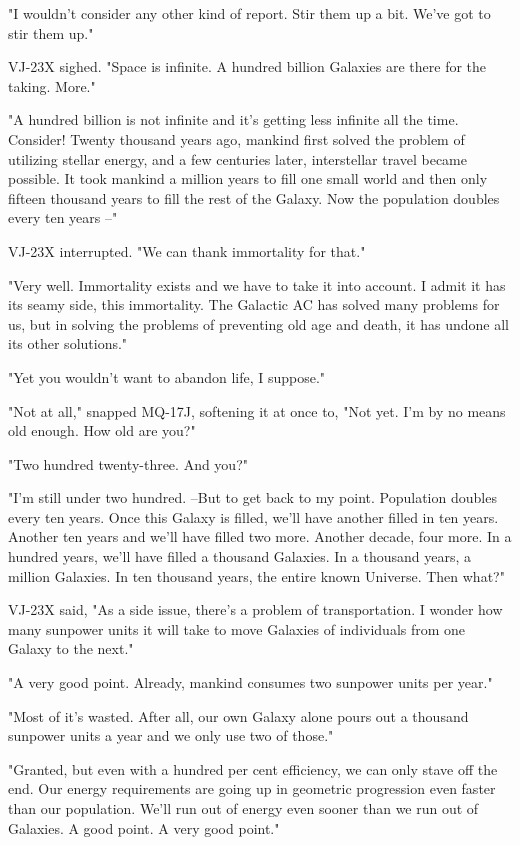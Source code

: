 \documentclass[11pt]{article}
\begin{document}
"I wouldn't consider any other kind of report. Stir them up a bit. We've got to stir them up."

VJ-23X sighed. "Space is infinite. A hundred billion Galaxies are there for the taking. More."

"A hundred billion is not infinite and it's getting less infinite all the time. Consider! Twenty thousand years ago, mankind first solved the problem of utilizing stellar energy, and a few centuries later, interstellar travel became possible. It took mankind a million years to fill one small world and then only fifteen thousand years to fill the rest of the Galaxy. Now the population doubles every ten years --"

VJ-23X interrupted. "We can thank immortality for that."

"Very well. Immortality exists and we have to take it into account. I admit it has its seamy side, this immortality. The Galactic AC has solved many problems for us, but in solving the problems of preventing old age and death, it has undone all its other solutions."

"Yet you wouldn't want to abandon life, I suppose."

"Not at all," snapped MQ-17J, softening it at once to, "Not yet. I'm by no means old enough. How old are you?"

"Two hundred twenty-three. And you?"

"I'm still under two hundred. --But to get back to my point. Population doubles every ten years. Once this Galaxy is filled, we'll have another filled in ten years. Another ten years and we'll have filled two more. Another decade, four more. In a hundred years, we'll have filled a thousand Galaxies. In a thousand years, a million Galaxies. In ten thousand years, the entire known Universe. Then what?"

VJ-23X said, "As a side issue, there's a problem of transportation. I wonder how many sunpower units it will take to move Galaxies of individuals from one Galaxy to the next."

"A very good point. Already, mankind consumes two sunpower units per year."

"Most of it's wasted. After all, our own Galaxy alone pours out a thousand sunpower units a year and we only use two of those."

"Granted, but even with a hundred per cent efficiency, we can only stave off the end. Our energy requirements are going up in geometric progression even faster than our population. We'll run out of energy even sooner than we run out of Galaxies. A good point. A very good point."
\end{document}
